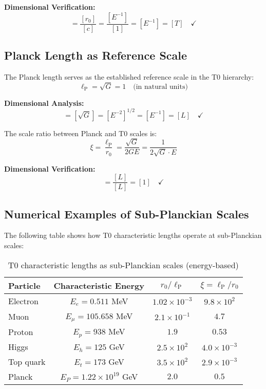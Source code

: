 \documentclass[12pt,a4paper]{report}
\newcommand{\lP}{\ell_{\text{P}}}         %
\newcommand{\rzero}{r_0}                  %
\newcommand{\tzero}{t_0}                  %
\begin{document}
	\textbf{Dimensional Verification:}
	\begin{equation}
		[\tzero] = \frac{[\rzero]}{[c]} = \frac{[E^{-1}]}{[1]} = [E^{-1}] = [T] \quad \checkmark
	\end{equation}
	
	\subsection{Planck Length as Reference Scale}\label{subsec:planck_reference_scale}
	
	The Planck length serves as the established reference scale in the T0 hierarchy:
	\begin{equation}
		\lP = \sqrt{G} = 1 \quad \text{(in natural units)}
	\end{equation}
	
	\textbf{Dimensional Analysis:}
	\begin{equation}
		[\lP] = [\sqrt{G}] = [E^{-2}]^{1/2} = [E^{-1}] = [L] \quad \checkmark
	\end{equation}
	
	The scale ratio between Planck and T0 scales is:
	\begin{equation}
		\xi = \frac{\lP}{\rzero} = \frac{\sqrt{G}}{2GE} = \frac{1}{2\sqrt{G} \cdot E}
	\end{equation}
	
	\textbf{Dimensional Verification:}
	\begin{equation}
		[\xi] = \frac{[L]}{[L]} = [1] \quad \checkmark
	\end{equation}
	
	\subsection{Numerical Examples of Sub-Planckian Scales}\label{subsec:numerical_sub_planckian}
	
	The following table shows how T0 characteristic lengths operate at sub-Planckian scales:
	
	\begin{table}[htbp]
		\centering
		\begin{tabular}{lccc}
			\toprule
			\textbf{Particle} & \textbf{Characteristic Energy} & \textbf{$\rzero/\lP$} & \textbf{$\xi = \lP/\rzero$} \\
			\midrule
			Electron & $E_e = 0.511$ MeV & $1.02 \times 10^{-3}$ & $9.8 \times 10^{2}$ \\
			Muon & $E_\mu = 105.658$ MeV & $2.1 \times 10^{-1}$ & $4.7$ \\
			Proton & $E_p = 938$ MeV & $1.9$ & $0.53$ \\
			Higgs & $E_h = 125$ GeV & $2.5 \times 10^{2}$ & $4.0 \times 10^{-3}$ \\
			Top quark & $E_t = 173$ GeV & $3.5 \times 10^{2}$ & $2.9 \times 10^{-3}$ \\
			Planck & $E_P = 1.22 \times 10^{19}$ GeV & $2.0$ & $0.5$ \\
			\bottomrule
		\end{tabular}
		\caption{T0 characteristic lengths as sub-Planckian scales (energy-based)}
		\label{tab:sub_planckian_scales}
	\end{table}
	
\end{document}
